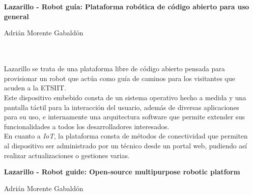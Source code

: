 \chapter*{}

\thispagestyle{empty}

\begin{center}
{\large\bfseries Lazarillo - Robot guía: Plataforma robótica de código abierto para uso general}\\
\end{center}
\begin{center}
Adrián Morente Gabaldón\\
\end{center}

\\

\vspace{0.7cm}
\\

Lazarillo se trata de una plataforma libre de código abierto pensada para provisionar un robot que actúa como guía de caminos para los visitantes que acuden a la ETSIIT.\\

Este dispositivo embebido consta de un sistema operativo hecho a medida y una pantalla táctil para la interacción del usuario, además de diversas aplicaciones para su uso, e internamente una arquitectura software que permite extender sus funcionalidades a todos los desarrolladores interesados.\\

En cuanto a \textit{IoT}, la plataforma consta de métodos de conectividad que permiten al dispositivo ser administrado por un técnico desde un portal web, pudiendo así realizar actualizaciones o gestiones varias.
\cleardoublepage


\thispagestyle{empty}


\begin{center}
{\large\bfseries Lazarillo - Robot guide: Open-source multipurpose robotic platform}\\
\end{center}
\begin{center}
Adrián Morente Gabaldón\\
\end{center}

